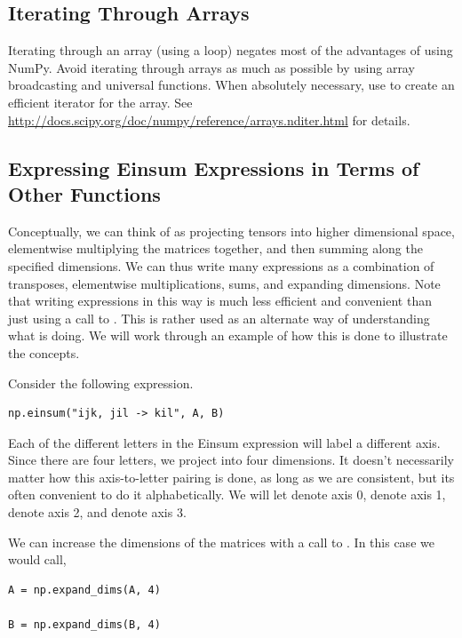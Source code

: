 \subsection*{Iterating Through Arrays} %

Iterating through an array (using a  loop) negates most of the advantages of using NumPy.
Avoid iterating through arrays as much as possible by using array broadcasting and universal functions.
When absolutely necessary, use  to create an efficient iterator for the array.
See \url{http://docs.scipy.org/doc/numpy/reference/arrays.nditer.html} for details.


\subsection*{Expressing Einsum Expressions in Terms of Other Functions} %

Conceptually, we can think of  as projecting tensors into higher dimensional space, elementwise multiplying the matrices together, and then summing along the specified dimensions. 
We can thus write many  expressions as a combination of transposes, elementwise multiplications, sums, and expanding dimensions. 
Note that writing  expressions in this way is much less efficient and convenient than just using a call to . 
This is rather used as an alternate way of understanding what  is doing.
We will work through an example of how this is done to illustrate the concepts.

Consider the following  expression.

\begin{lstlisting}
np.einsum("ijk, jil -> kil", A, B)
\end{lstlisting}

Each of the different letters in the Einsum expression will label a different axis. Since there are four letters, we project into four dimensions.
It doesn't necessarily matter how this axis-to-letter pairing is done, as long as we are consistent, but its often convenient to do it alphabetically. 
We will let  denote axis 0,  denote axis 1,  denote axis 2, and  denote axis 3. 

We can increase the dimensions of the matrices with a call to . In this case we would call, 

\begin{lstlisting}
A = np.expand_dims(A, 4)

B = np.expand_dims(B, 4)
\end{lstlisting}

